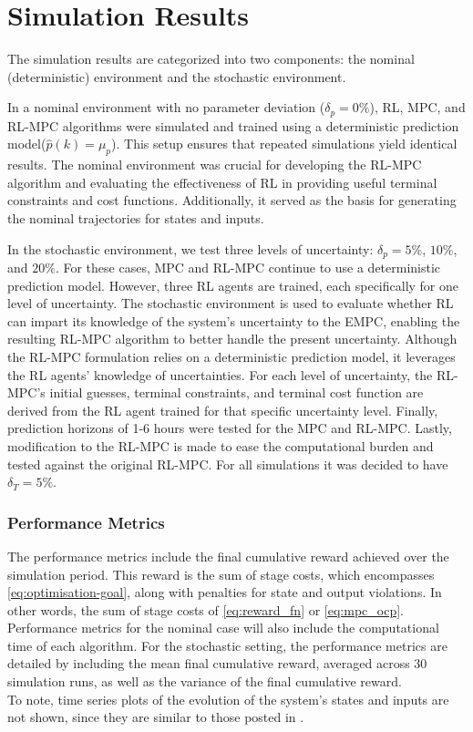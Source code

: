 \section{Simulation Results}
The simulation results are categorized into two components: the nominal (deterministic) environment and the stochastic environment.


In a nominal environment with no parameter deviation ($\delta_p = 0\%$), RL, MPC, and RL-MPC algorithms were simulated and trained using a deterministic prediction model($\hat{p}(k) = \mu_p$). This setup ensures that repeated simulations yield identical results. The nominal environment was crucial for developing the RL-MPC algorithm and evaluating the effectiveness of RL in providing useful terminal constraints and cost functions. Additionally, it served as the basis for generating the nominal trajectories for states and inputs.

In the stochastic environment, we test three levels of uncertainty: $\delta_p = 5\%$, $10\%$, and $20\%$. For these cases, MPC and RL-MPC continue to use a deterministic prediction model. However, three RL agents are trained, each specifically for one level of uncertainty. The stochastic environment is used to evaluate whether RL can impart its knowledge of the system's uncertainty to the EMPC, enabling the resulting RL-MPC algorithm to better handle the present uncertainty. Although the RL-MPC formulation relies on a deterministic prediction model, it leverages the RL agents’ knowledge of uncertainties. For each level of uncertainty, the RL-MPC’s initial guesses, terminal constraints, and terminal cost function are derived from the RL agent trained for that specific uncertainty level. Finally, prediction horizons of 1-6 hours were tested for the MPC and RL-MPC. Lastly, modification to the RL-MPC is made to ease the computational burden and tested against the original RL-MPC. For all simulations it was decided to have $\delta_T = 5\%$.

\subsubsection{Performance Metrics}
The performance metrics include the final cumulative reward achieved over the simulation period. This reward is the sum of stage costs, which encompasses \autoref{eq:optimisation-goal}, along with penalties for state and output violations. In other words, the sum of stage costs of \autoref{eq:reward_fn} or \autoref{eq:mpc_ocp}. Performance metrics for the nominal case will also include the computational time of each algorithm. For the stochastic setting, the performance metrics are detailed by including the mean final cumulative reward, averaged across 30 simulation runs, as well as the variance of the final cumulative reward.\\
To note, time series plots of the evolution of the system's states and inputs are not shown, since they are similar to those posted in \cite{morcegoReinforcementLearningModel2023, jansenOptimalControlLettuce2023, boersmaRobustSamplebasedModel2022}.

